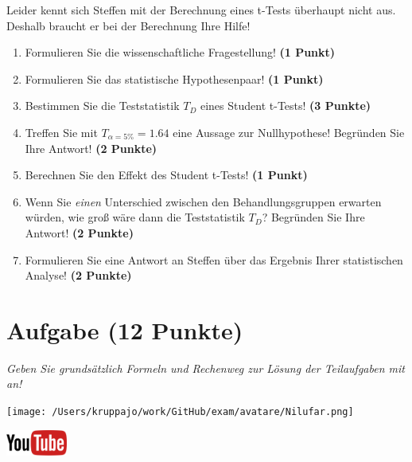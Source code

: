 \documentclass[a4paper, 9pt]{scrartcl}\usepackage[]{graphicx}\usepackage[]{xcolor}
\begin{document}
Leider kennt sich Steffen mit der Berechnung eines t-Tests überhaupt nicht aus. Deshalb braucht er bei der Berechnung Ihre Hilfe!

\begin{enumerate}
  \item Formulieren Sie die wissenschaftliche Fragestellung! \textbf{(1 Punkt)}
  \item Formulieren Sie das statistische Hypothesenpaar! \textbf{(1 Punkt)}
  \item Bestimmen Sie die Teststatistik $T_{D}$ eines Student t-Tests! \textbf{(3 Punkte)}
\item Treffen Sie mit $T_{\alpha = 5\%} = 1.64$ eine Aussage zur Nullhypothese! Begründen Sie Ihre Antwort! \textbf{(2 Punkte)}
\item Berechnen Sie den Effekt des Student t-Tests! \textbf{(1 Punkt)}
\item Wenn Sie \textit{einen} Unterschied zwischen den Behandlungsgruppen erwarten würden, wie groß wäre dann die Teststatistik $T_{D}$? Begründen Sie Ihre Antwort! \textbf{(2 Punkte)}
\item Formulieren Sie eine Antwort an Steffen über das Ergebnis Ihrer statistischen Analyse! \textbf{(2 Punkte)}
\end{enumerate} 
\clearpage

\section{Aufgabe \hfill (12 Punkte)}

\textit{Geben Sie grundsätzlich Formeln und Rechenweg zur Lösung der Teilaufgaben mit an!} \\[1Ex]
 

 
\begin{minipage}[t]{0.5\textwidth}
\texttt{[image: /Users/kruppajo/work/GitHub/exam/avatare/Nilufar.png]}
\end{minipage}
\begin{minipage}[t]{0.5\textwidth}
\hfill
\href{https://youtu.be/TbSEOMCQYl4}{\includegraphics[width = 2cm]{img/youtube}}\\[1Ex]
\end{minipage}
\vspace{1ex}
\end{document}
